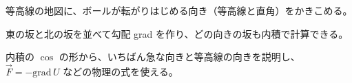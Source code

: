 \begin{furikaeri}
\begin{checklist}
\item 等高線の地図に、ボールが転がりはじめる向き（等高線と直角）をかきこめる。
\item 東の坂と北の坂を並べて勾配 grad を作り、どの向きの坂も内積で計算できる。
\item 内積の $\cos$ の形から、いちばん急な向きと等高線の向きを説明し、$\vec F=-\mathrm{grad}\,U$ などの物理の式を使える。
\end{checklist}
\end{furikaeri}
